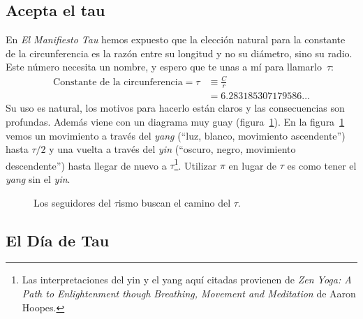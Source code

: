 
  \subsection{Acepta el tau} %
  \label{sec:embrace_the_tau}

En \emph{El Manifiesto Tau} hemos expuesto que la elección natural para la constante de la circunferencia es la razón entre su longitud y no su diámetro, sino su radio. Este número necesita un nombre, y espero que te unas a mí para llamarlo~$\tau$:
\[
\begin{split}
\mbox{Constante de la circunferencia} = \tau & \equiv \frac{C}{r} \\
                                             & = 6.283185307179586\ldots
\end{split}
\]
Su uso es natural, los motivos para hacerlo están claros y las consecuencias son profundas. Además viene con un diagrama muy guay (figura~\ref{fig:tauism}). En la figura~\ref{fig:tauism} vemos un movimiento a través del \emph{yang} (``luz, blanco, movimiento ascendente'') hasta $\tau/2$ y una vuelta a través del \emph{yin} (``oscuro, negro, movimiento descendente'') hasta llegar de nuevo a $\tau$\footnote{Las interpretaciones del yin y el yang aquí citadas provienen de \emph{Zen Yoga: A Path to Enlightenment though Breathing, Movement and Meditation} de Aaron Hoopes.}. Utilizar $\pi$ en lugar de $\tau$ es como tener el \emph{yang} sin el \emph{yin}.

\begin{figure}
\begin{center}
\end{center}
\caption{Los seguidores del $\tau$ismo buscan el camino del $\tau$.\label{fig:tauism}}
\end{figure}



\renewcommand{\thesubsection}{6.28}

  \subsection{El Día de Tau} %
  \label{sec:tau_day}

